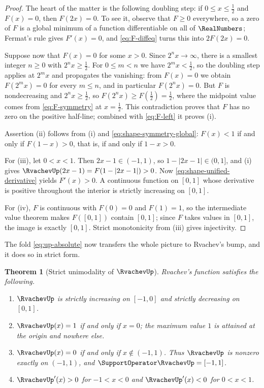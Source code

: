 \documentclass[11pt,oneside]{article}
\newtheorem{theorem}{Theorem}[section]
\theoremstyle{definition}
\theoremstyle{remark}
\begin{document}
\begin{proof}
The heart of the matter is the following doubling step: if $0\le x\le\tfrac12$ and $F(x)=0$,
then $F(2x)=0$.  To see it, observe that $F\ge0$ everywhere, so a zero of $F$ is a global
minimum of a function differentiable on all of $\RealNumbers$; Fermat's rule gives $F'(x)=0$, and
\eqref{eq:F-diffeq} turns this into $2F(2x)=0$.

Suppose now that $F(x)=0$ for some $x>0$.  Since $2^nx\to\infty$, there is a smallest
integer $n\ge0$ with $2^nx\ge\tfrac12$.  For $0\le m<n$ we have $2^mx<\tfrac12$, so the
doubling step applies at $2^mx$ and propagates the vanishing: from $F(x)=0$ we obtain
$F(2^mx)=0$ for every $m\le n$, and in particular $F(2^nx)=0$.  But $F$ is nondecreasing and
$2^nx\ge\tfrac12$, so $F(2^nx)\ge F(\tfrac12)=\tfrac12$, where the midpoint value comes from
\eqref{eq:F-symmetry} at $x=\tfrac12$.  This contradiction proves that $F$ has no zero on the
positive half-line; combined with \eqref{eq:F-left} it proves (i).

Assertion (ii) follows from (i) and \eqref{eq:shape-symmetry-global}: $F(x)<1$ if and only if
$F(1-x)>0$, that is, if and only if $1-x>0$.

For (iii), let $0<x<1$.  Then $2x-1\in(-1,1)$, so $1-|2x-1|\in(0,1]$, and (i) gives
$\RvachevUp(2x-1)=F(1-|2x-1|)>0$.  Now \eqref{eq:shape-unified-derivative} yields $F'(x)>0$.  A
continuous function on $[0,1]$ whose derivative is positive throughout the interior is
strictly increasing on $[0,1]$.

For (iv), $F$ is continuous with $F(0)=0$ and $F(1)=1$, so the intermediate value theorem
makes $F([0,1])$ contain $[0,1]$; since $F$ takes values in $[0,1]$, the image is exactly
$[0,1]$.  Strict monotonicity from (iii) gives injectivity.
\end{proof}

The fold \eqref{eq:up-absolute} now transfers the whole picture to Rvachev's bump, and it
does so in strict form.

\begin{theorem}[Strict unimodality of $\RvachevUp$]
\label{thm:shape-unimodal}
Rvachev's function satisfies the following.
\begin{enumerate}
\item $\RvachevUp$ is strictly increasing on $[-1,0]$ and strictly decreasing on $[0,1]$.
\item $\RvachevUp(x)=1$ if and only if $x=0$; the maximum value $1$ is attained at the origin and
      nowhere else.
\item $\RvachevUp(x)=0$ if and only if $x\notin(-1,1)$.  Thus $\RvachevUp$ is nonzero exactly on
      $(-1,1)$, and $\SupportOperator\RvachevUp=[-1,1]$.
\item $\RvachevUp'(x)>0$ for $-1<x<0$ and $\RvachevUp'(x)<0$ for $0<x<1$.
\end{enumerate}
\end{theorem}
\end{document}
